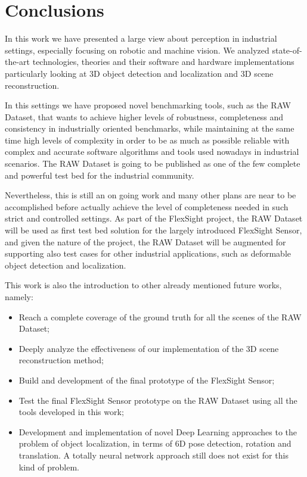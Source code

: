 \chapter{Conclusions}\label{ch:conclusions}
In this work we have presented a large view about perception in industrial settings, especially focusing on robotic and machine vision. We analyzed state-of-the-art technologies, theories and their software and hardware implementations particularly looking at 3D object detection and localization and 3D scene reconstruction.

In this settings we have proposed novel benchmarking tools, such as the RAW Dataset, that wants to achieve higher levels of robustness, completeness and consistency in industrially oriented benchmarks, while maintaining at the same time high levels of complexity in order to be as much as possible reliable with complex and accurate software algorithms and tools used nowadays in industrial scenarios. The RAW Dataset is going to be published as one of the few complete and powerful test bed for the industrial community.

Nevertheless, this is still an on going work and many other plans are near to be accomplished before actually achieve the level of completeness needed in such strict and controlled settings. As part of the FlexSight project, the RAW Dataset will be used as first test bed solution for the largely introduced FlexSight Sensor, and given the nature of the project, the RAW Dataset will be augmented for supporting also test cases for other industrial applications, such as deformable object detection and localization.

This work is also the introduction to other already mentioned future works, namely:

\begin{itemize}
	\item Reach a complete coverage of the ground truth for all the scenes of the RAW Dataset;
	\item Deeply analyze the effectiveness of our implementation of the 3D scene reconstruction method;
	\item Build and development of the final prototype of the FlexSight Sensor;
	\item Test the final FlexSight Sensor prototype on the RAW Dataset using all the tools developed in this work;
	\item Development and implementation of novel Deep Learning approaches to the problem of object localization, in terms of 6D pose detection, rotation and translation. A totally neural network approach still does not exist for this kind of problem.
\end{itemize}

